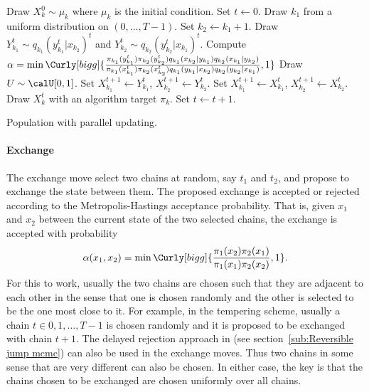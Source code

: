\begin{algorithm}
\begin{algorithmic}
  \tophrule
    \STATE Draw $X_k^0\sim\mu_k$ where $\mu_k$ is the initial condition.
  \ENDFOR
  \STATE Set $t\leftarrow0$.
  \REPEAT
    \STATE Draw $k_1$ from a uniform distribution on $(0,\dots,T-1)$. Set
    $k_2\leftarrow k_1 + 1$.
    \STATE Draw $Y_{k_1}^t\sim q_{k_1}(y_{k_1}^t|x_{k_2})^t$ and
    $Y_{k_2}^t\sim q_{k_2}(y_{k_2}^t|x_{k_1})^t$.
    \STATE Compute $\alpha = \min\Curly[bigg]{
      \frac{\pi_{k_1}(y_{k_1}^t)\pi_{k_2}(y_{k_2}^t)
        q_{k_1}(x_{k_2}|y_{k_1})q_{k_2}(x_{k_1}|y_{k_2})}
      {\pi_{k_1}(x_{k_1}^t)\pi_{k_2}(x_{k_2}^t)
        q_{k_1}(y_{k_1}|x_{k_2})q_{k_2}(y_{k_2}|x_{k_1})}, 1}$
    \STATE Draw $U\sim\calU[0,1]$.
      \STATE Set $X_{k_1}^{t+1}\leftarrow Y_{k_1}^t$, $X_{k_2}^{t+1}\leftarrow
          Y_{k_2}^t$.
    \ELSE
      \STATE Set $X_{k_1}^{t+1}\leftarrow X_{k_1}^t$, $X_{k_2}^{t+1}\leftarrow
          X_{k_2}^t$.
    \ENDIF
      \STATE Draw $X_k^t$ with an \mcmc algorithm target $\pi_k$.
    \ENDFOR
    \STATE Set $t\leftarrow t+1$.
  \bottomhrule
\end{algorithmic}
\caption{Population \mcmc with parallel updating.}
\label{alg:pmcmc}
\end{algorithm}

\paragraph{Exchange}

The exchange move select two chains at random, say $t_1$ and $t_2$, and
propose to exchange the state between them. The proposed exchange is accepted
or rejected according to the Metropolis-Hastings acceptance probability. That
is, given $x_1$ and $x_2$ between the current state of the two selected
chains, the exchange is accepted with probability
\begin{equation}
  \alpha(x_1, x_2) =
  \min\Curly[bigg]{\frac{\pi_1(x_2)\pi_2(x_1)}{\pi_1(x_1)\pi_2(x_2)}, 1}.
  \label{eq:exchange accept}
\end{equation}
For this to work, usually the two chains are chosen such that they are
adjacent to each other in the sense that one is chosen randomly and the other
is selected to be the one most close to it. For example, in the tempering
scheme, usually a chain $t\in{0,1,\dots,T-1}$ is chosen randomly and it is
proposed to be exchanged with chain $t+1$. The delayed rejection approach in
\cite{Green:2001tk} (see section~\ref{sub:Reversible jump mcmc}) can also be
used in the exchange moves. Thus two chains in some sense that are very
different can also be chosen. In either case, the key is that the chains
chosen to be exchanged are chosen uniformly over all chains.

